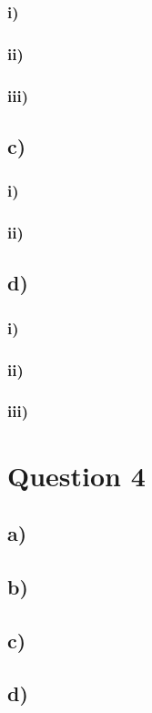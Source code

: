 \documentclass[12pt]{article}
\begin{document}
     \subsubsection*{i)}       
    
    \subsubsection*{ii)}
    
     \subsubsection*{iii)}
    
     \subsection*{c)}
     \subsubsection*{i)}       
    
    \subsubsection*{ii)}
    
     \subsection*{d)}
     \subsubsection*{i)}       
    
    \subsubsection*{ii)}
    
     \subsubsection*{iii)}
       
     \section*{Question 4}
     \subsection*{a)}
    
     \subsection*{b)}
    
     \subsection*{c)}
    
     \subsection*{d)}     
    
\end{document}
